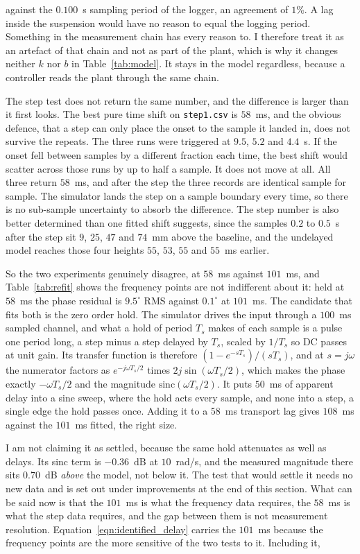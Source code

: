 against the $0.100$~s sampling period of the logger, an agreement of $1$\%. A lag inside the
suspension would have no reason to equal the logging period. Something in the measurement
chain has every reason to. I therefore treat it as an artefact of that chain and not as part
of the plant, which is why it changes neither $k$ nor $b$ in Table~\ref{tab:model}. It stays
in the model regardless, because a controller reads the plant through the same chain.

The step test does not return the same number, and the difference is larger than it first
looks. The best pure time shift on \texttt{step1.csv} is $58$~ms, and the obvious defence, that
a step can only place the onset to the sample it landed in, does not survive the repeats.
The three runs were triggered at $9.5$, $5.2$ and $4.4$~s. If the onset fell between samples
by a different fraction each time, the best shift would scatter across those runs by up to
half a sample. It does not move at all. All three return $58$~ms, and after the step the three
records are identical sample for sample. The simulator lands the step on a sample boundary
every time, so there is no sub-sample uncertainty to absorb the difference. The step number is
also better determined than one fitted shift suggests, since the samples $0.2$ to $0.5$~s
after the step sit $9$, $25$, $47$ and $74$~mm above the baseline, and the undelayed model
reaches those four heights $55$, $53$, $55$ and $55$~ms earlier.

So the two experiments genuinely disagree, at $58$~ms against $101$~ms, and
Table~\ref{tab:refit} shows the frequency points are not indifferent about it: held at $58$~ms
the phase residual is $9.5^\circ$ RMS against $0.1^\circ$ at $101$~ms. The candidate that fits
both is the zero order hold. The simulator drives the input through a $100$~ms sampled channel,
and what a hold of period $T_s$ makes of each sample is a pulse one period long, a step minus
a step delayed by $T_s$, scaled by $1/T_s$ so DC passes at unit gain. Its transfer function is
therefore $(1 - e^{-sT_s})/(sT_s)$, and at $s = j\omega$ the numerator factors as
$e^{-j\omega T_s/2}$ times $2j\sin(\omega T_s/2)$, which makes the phase exactly
$-\omega T_s/2$ and the magnitude $\mathrm{sinc}(\omega T_s/2)$.
It puts $50$~ms of apparent delay into a sine sweep, where the hold
acts every sample, and none into a step, a single edge the hold passes once. Adding it to a
$58$~ms transport lag gives $108$~ms against the $101$~ms fitted, the right size.

I am not claiming it as settled, because the same hold attenuates as well as delays. Its
sinc term is $-0.36$~dB at $10$~rad/s, and the measured
magnitude there sits $0.70$~dB \emph{above} the model, not below it. The test that would
settle it needs no new data and is set out under improvements at the end of this section.
What can be said now is
that the $101$~ms is what the frequency data requires, the $58$~ms is what the step data
requires, and the gap between them is not measurement resolution.
Equation~\ref{eqn:identified_delay} carries the $101$~ms because the frequency points are the
more sensitive of the two tests to it. Including it,

